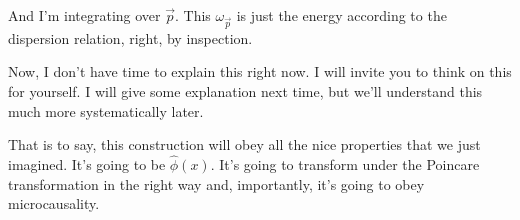 
And I'm integrating over \(\vec p\). This \(\omega_{\vec p}\) is just the energy according to the dispersion relation, right, by inspection.


Now, I don't have time to explain this right now. I will invite you to think on this for yourself. I will give some explanation next time, but we'll understand this much more systematically later.


That is to say, this construction will obey all the nice properties that we just imagined. It's going to be \(\widehat\phi(x)\). It's going to transform under the Poincare transformation in the right way and, importantly, it's going to obey microcausality.


